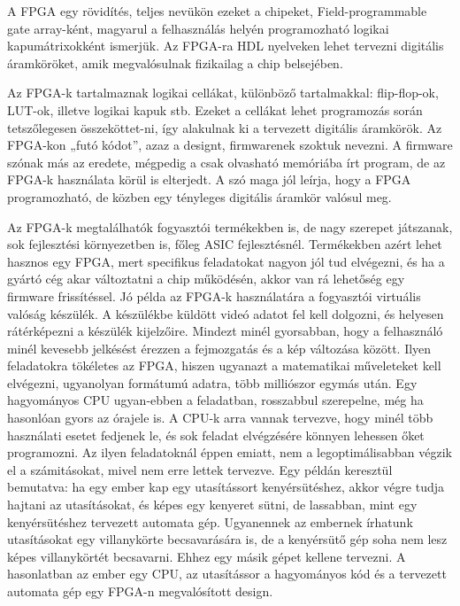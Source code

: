 \documentclass[a4paper,12pt,oneside]{book}
\begin{document}
A FPGA egy rövidítés, teljes nevükön ezeket a chipeket, Field-programmable gate array-ként, magyarul a felhasználás helyén programozható logikai kapumátrixokként ismerjük. Az FPGA-ra HDL nyelveken lehet tervezni digitális áramköröket, amik megvalósulnak fizikailag a chip belsejében. 

Az FPGA-k tartalmaznak logikai cellákat, különböző tartalmakkal: flip-flop-ok, LUT-ok, illetve logikai kapuk stb. Ezeket a cellákat lehet programozás során tetszőlegesen összeköttet-ni, így alakulnak ki a tervezett digitális áramkörök. Az FPGA-kon „futó kódot”, azaz a designt, firmwarenek szoktuk nevezni. A firmware szónak más az eredete, mégpedig a csak olvasható memóriába írt program, de az FPGA-k használata körül is elterjedt. A szó maga jól leírja, hogy a FPGA programozható, de közben egy tényleges digitális áramkör valósul meg.

Az FPGA-k megtalálhatók fogyasztói termékekben is, de nagy szerepet játszanak, sok fejlesztési környezetben is, főleg ASIC fejlesztésnél. Termékekben azért lehet hasznos egy FPGA, mert specifikus feladatokat nagyon jól tud elvégezni, és ha a gyártó cég akar változtatni a chip működésén, akkor van rá lehetőség egy firmware frissítéssel. Jó példa az FPGA-k használatára a fogyasztói virtuális valóság készülék. A készülékbe küldött videó adatot fel kell dolgozni, és helyesen rátérképezni a készülék kijelzőire. Mindezt minél gyorsabban, hogy a felhasználó minél kevesebb jelkésést érezzen a fejmozgatás és a kép változása között. Ilyen feladatokra tökéletes az FPGA, hiszen ugyanazt a matematikai műveleteket kell elvégezni, ugyanolyan formátumú adatra, több milliószor egymás után. Egy hagyományos CPU ugyan-ebben a feladatban, rosszabbul szerepelne, még ha hasonlóan gyors az órajele is. A CPU-k arra vannak tervezve, hogy minél több használati esetet fedjenek le, és sok feladat elvégzésére könnyen lehessen őket programozni. Az ilyen feladatoknál éppen emiatt, nem a legoptimálisabban végzik el a számitásokat, mivel nem erre lettek tervezve. Egy példán keresztül bemutatva: ha egy ember kap egy utasítássort kenyérsütéshez, akkor végre tudja hajtani az utasításokat, és képes egy kenyeret sütni, de lassabban, mint egy kenyérsütéshez tervezett automata gép. Ugyanennek az embernek írhatunk utasításokat egy villanykörte becsavarására is, de a kenyérsütő gép soha nem lesz képes villanykörtét becsavarni. Ehhez egy másik gépet kellene tervezni. A hasonlatban az ember egy CPU, az utasítássor a hagyományos kód és a tervezett automata gép egy FPGA-n megvalósított design.
\end{document}
